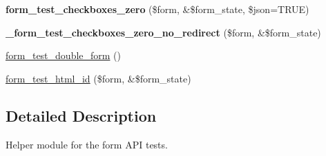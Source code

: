\begin{DoxyCompactItemize}
\item 
\hypertarget{form__test_8module_a0584f30c866715277c6daed394216a8d}{
{\bfseries form\_\-test\_\-checkboxes\_\-zero} (\$form, \&\$form\_\-state, \$json=TRUE)}
\label{form__test_8module_a0584f30c866715277c6daed394216a8d}

\item 
\hypertarget{form__test_8module_ab661d773d431eb5fdf3eac813fc5acff}{
{\bfseries \_\-form\_\-test\_\-checkboxes\_\-zero\_\-no\_\-redirect} (\$form, \&\$form\_\-state)}
\label{form__test_8module_ab661d773d431eb5fdf3eac813fc5acff}

\item 
\hyperlink{form__test_8module_acbe9a5b2d93fddf286196506d42508b5}{form\_\-test\_\-double\_\-form} ()
\item 
\hyperlink{form__test_8module_a020b67fab9b34897837b3adee33f35aa}{form\_\-test\_\-html\_\-id} (\$form, \&\$form\_\-state)
\end{DoxyCompactItemize}


\subsection{Detailed Description}
Helper module for the form API tests. 


